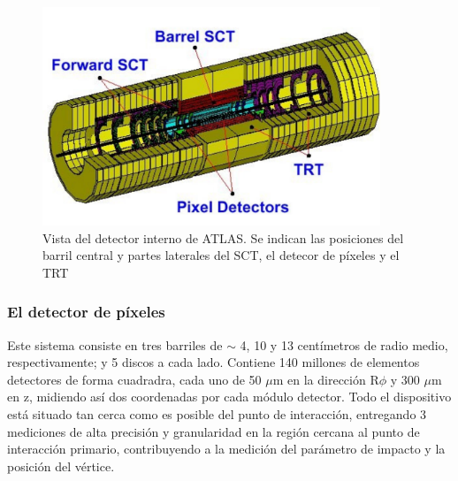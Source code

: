 \begin{figure}[htbp]
  \begin{center}
      \includegraphics[width=0.9\textwidth]{Fig2/innnerdetector3d.pdf}
    \caption{Vista del detector interno de ATLAS. Se indican las posiciones del barril central y partes laterales del SCT, el detecor de p\'ixeles y el TRT}
    \label{fig:figinner}
  \end{center}
\end{figure}


\subsubsection{El detector de p\'ixeles}

   Este sistema consiste en tres barriles de $\sim$ 4, 10 y 13 cent\'imetros de radio medio, respectivamente; y 5 discos a cada lado. Contiene 140 millones de elementos detectores de forma cuadradra,  cada uno de 50 $\mu$m en la direcci\'on R$\phi$ y 300 $\mu$m en z, midiendo as\'i dos coordenadas por cada m\'odulo detector. Todo el dispositivo est\'a situado tan cerca como es posible del punto de interacci\'on, entregando 3 mediciones de alta precisi\'on y granularidad en la regi\'on cercana al punto de interacci\'on primario, contribuyendo a la medici\'on del par\'ametro de impacto y la posici\'on del v\'ertice.

